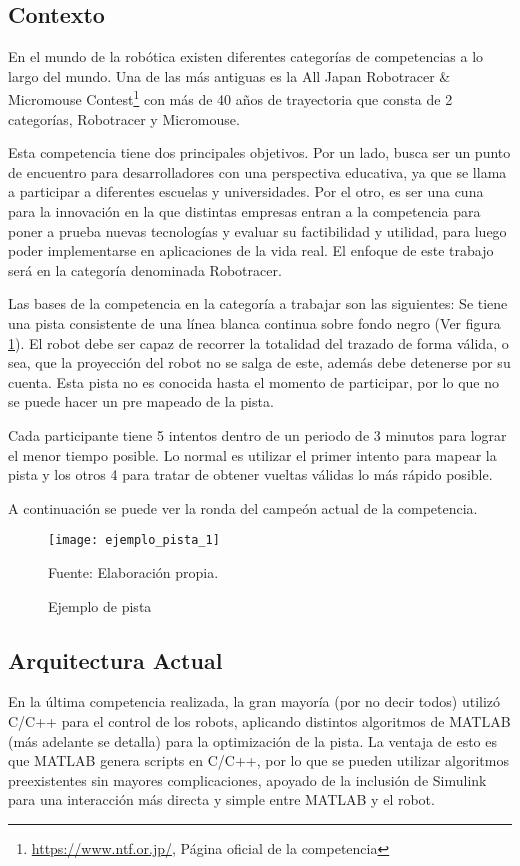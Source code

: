 
\subsection{Contexto}

En el mundo de la robótica existen diferentes categorías de competencias a lo largo del mundo. Una de las más antiguas es la All Japan Robotracer \& Micromouse Contest\footnote{\url{https://www.ntf.or.jp/}, Página oficial de la competencia} con más de 40 años de trayectoria que consta de 2 categorías, Robotracer y Micromouse.

Esta competencia tiene dos principales objetivos. Por un lado, busca ser un punto de encuentro para desarrolladores con una perspectiva educativa, ya que se llama a participar a diferentes escuelas y universidades. Por el otro, es ser una cuna para la innovación en la que distintas empresas entran a la competencia para poner a prueba nuevas tecnologías y evaluar su factibilidad y utilidad, para luego poder implementarse en aplicaciones de la vida real. El enfoque de este trabajo será en la categoría denominada Robotracer.

Las bases de la competencia en la categoría a trabajar son las siguientes: Se tiene una pista consistente de una línea blanca continua sobre fondo negro (Ver figura \ref{fig:pista1}). El robot debe ser capaz de recorrer la totalidad del trazado de forma válida, o sea, que la proyección del robot no se salga de este, además debe detenerse por su cuenta. Esta pista no es conocida hasta el momento de participar, por lo que no se puede hacer un pre mapeado de la pista.

Cada participante tiene 5 intentos dentro de un periodo de 3 minutos para lograr el menor tiempo posible. Lo normal es utilizar el primer intento para mapear la pista y los otros 4 para tratar de obtener vueltas válidas lo más rápido posible.

A continuación se puede ver la ronda del campeón actual de la competencia. \cite{ganador2023}

\begin{figure}[h]
\centering
\texttt{[image: ejemplo\_pista\_1]}
\caption{\label{fig:pista1} Ejemplo de pista} Fuente: Elaboración propia.
\end{figure}

\subsection{Arquitectura Actual}
En la última competencia realizada, la gran mayoría (por no decir todos) utilizó C/C++ para el control de los robots, aplicando distintos algoritmos de MATLAB (más adelante se detalla) para la optimización de la pista. La ventaja de esto es que MATLAB genera scripts en C/C++, por lo que se pueden utilizar algoritmos preexistentes sin mayores complicaciones, apoyado de la inclusión de Simulink para una interacción más directa y simple entre MATLAB y el robot.

